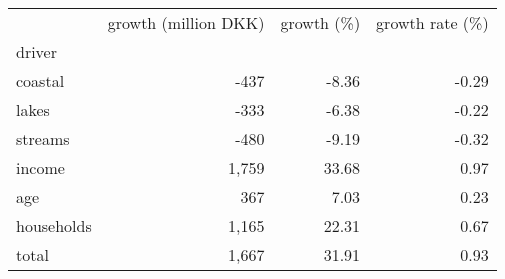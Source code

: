 \begin{tabular}{lrrr}
\toprule
 & growth (million DKK) & growth (\%) & growth rate (\%) \\
driver &  &  &  \\
\midrule
coastal & -437 & -8.36 & -0.29 \\
lakes & -333 & -6.38 & -0.22 \\
streams & -480 & -9.19 & -0.32 \\
income & 1,759 & 33.68 & 0.97 \\
age & 367 & 7.03 & 0.23 \\
households & 1,165 & 22.31 & 0.67 \\
total & 1,667 & 31.91 & 0.93 \\
\bottomrule
\end{tabular}
